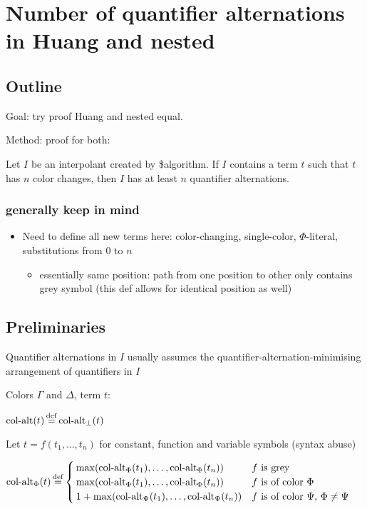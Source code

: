 \documentclass[,%
	draft=false,%
	numbers=noendperiod
	12pt,
	a4paper,
	oneside,%
	openany,
]{memoir}
\begin{document}
\chapter{ Number of quantifier alternations in Huang and nested }

\section{ Outline }

Goal: try proof Huang and nested equal.

Method: proof for both:

\begin{cprop}
	Let $I$ be an interpolant created by \$algorithm.
	If $I$ contains a term $t$ such that $t$ has $n$ color changes, then $I$ has at least $n$ quantifier alternations.
\end{cprop}

\subsection{generally keep in mind}

\begin{itemize}
	\item Need to define all new terms here: color-changing, single-color, $\Phi$-literal, substitutions from $0$ to $n$
\begin{itemize}
	\item essentially same position: path from one position to other only contains grey symbol (this def allows for identical position as well)
\end{itemize}
\end{itemize}

\section{ Preliminaries }

Quantifier alternations in $I$ usually assumes the quantifier-alternation-minimising arrangement of quantifiers in $I$ 

\begin{defi}
	Colors $\Gamma$ and $\Delta$, term $t$:

	$\ca(t) \defeq \ca_\bot(t)$

	Let $t = f(t_1, \dots, t_n)$ for constant, function and variable symbols (syntax abuse)

	
	$\ca_\Phi(t) \defeq 
	\begin{cases}
		\max(\ca_\Phi(t_1), \dots, \ca_\Phi(t_n)) & \text{$f$ is grey} \\
		\max(\ca_\Phi(t_1), \dots, \ca_\Phi(t_n)) & \text{$f$ is of color $\Phi$} \\
		1 + \max(\ca_\Psi(t_1), \dots, \ca_\Psi(t_n)) & \text{$f$ is of color $\Psi$, $\Phi \neq \Psi$} \\
	\end{cases}
	$
\end{defi}
\end{document}
